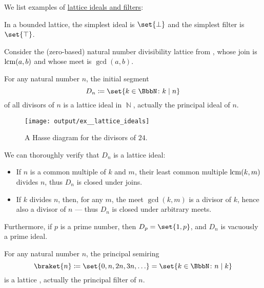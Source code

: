 \begin{example}\label{ex:def:lattice_ideal}
  We list examples of \hyperref[def:lattice_ideal]{lattice ideals and filters}:
  \begin{thmenum}
     In a bounded lattice, the simplest ideal is \( \set{ \bot } \) and the simplest filter is \( \set{ \top } \).

     Consider the (zero-based) natural number divisibility lattice from , whose join is \( \operatorname{lcm}(a, b) \) and whose meet is \( \gcd(a, b) \).

    For any natural number \( n \), the initial segment
    \begin{equation*}
      D_n \coloneqq \set{ k \in \BbbN \colon k \mid n }
    \end{equation*}
    of all divisors of \( n \) is a lattice ideal in \( \BbbN \), actually the principal ideal of \( n \).

    \begin{figure}[!ht]
      \centering
      \texttt{[image: output/ex\_\_lattice\_ideals]}
      \caption{A Hasse diagram for the divisors of \( 24 \).}
      \label{fig:ex:def:lattice_ideal/lattice}
    \end{figure}

    We can thoroughly verify that \( D_n \) is a lattice ideal:
    \begin{itemize}
      \item If \( n \) is a common multiple of \( k \) and \( m \), their least common multiple \( \operatorname{lcm}(k, m) \) divides \( n \), thus \( D_n \) is closed under joins.
      \item If \( k \) divides \( n \), then, for any \( m \), the meet \( \gcd(k, m) \) is a divisor of \( k \), hence also a divisor of \( n \) --- thus \( D_n \) is closed under arbitrary meets.
    \end{itemize}

    Furthermore, if \( p \) is a prime number, then \( D_p = \set{ 1, p } \), and \( D_n \) is vacuously a prime ideal.

     For any natural number \( n \), the principal semiring 
    \begin{equation*}
      \braket{ n } \coloneqq \set{ 0, n, 2n, 3n, \ldots } = \set{ k \in \BbbN \colon n \mid k }
    \end{equation*}
    is a lattice , actually the principal filter of \( n \).


\end{thmenum}
\end{example}
